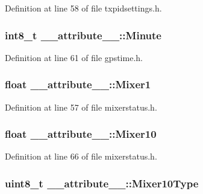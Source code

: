 \-Definition at line 58 of file txpidsettings.\-h.

\hypertarget{struct____attribute_____a8248d68e71037763d6f71a880154d0f5}{
\subsubsection[{\-Minute}]{\setlength{\rightskip}{0pt plus 5cm}int8\-\_\-t {\bf \-\_\-\-\_\-attribute\-\_\-\-\_\-\-::\-Minute}}}\label{struct____attribute_____a8248d68e71037763d6f71a880154d0f5}


\-Definition at line 61 of file gpstime.\-h.

\hypertarget{struct____attribute_____a39ea84a685fa3ed9bb6e615646fba4ac}{
\subsubsection[{\-Mixer1}]{\setlength{\rightskip}{0pt plus 5cm}float {\bf \-\_\-\-\_\-attribute\-\_\-\-\_\-\-::\-Mixer1}}}\label{struct____attribute_____a39ea84a685fa3ed9bb6e615646fba4ac}


\-Definition at line 57 of file mixerstatus.\-h.

\hypertarget{struct____attribute_____a588819a12e7b2c0fa7dd26cecb59761c}{
\subsubsection[{\-Mixer10}]{\setlength{\rightskip}{0pt plus 5cm}float {\bf \-\_\-\-\_\-attribute\-\_\-\-\_\-\-::\-Mixer10}}}\label{struct____attribute_____a588819a12e7b2c0fa7dd26cecb59761c}


\-Definition at line 66 of file mixerstatus.\-h.

\hypertarget{struct____attribute_____aa8223c53124cad03784a9947111265d8}{
\subsubsection[{\-Mixer10\-Type}]{\setlength{\rightskip}{0pt plus 5cm}uint8\-\_\-t {\bf \-\_\-\-\_\-attribute\-\_\-\-\_\-\-::\-Mixer10\-Type}}}\label{struct____attribute_____aa8223c53124cad03784a9947111265d8}


